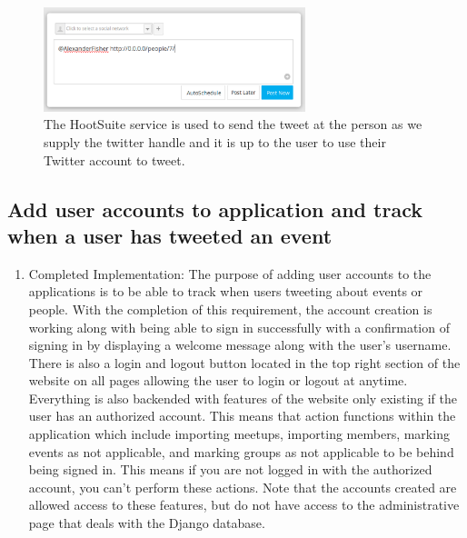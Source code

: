 \documentclass[draftclsnofoot,10pt,onecolumn]{IEEEtran} %
\begin{document}
\begin{enumerate}
\begin{figure}[H]
\begin{center}
  \end{center}
\end{figure}

\begin{figure}[H]
  \begin{center}
  
  \includegraphics[width=3in, frame]{tweet_person2}
  	\captionsetup{width=.4\linewidth}
  \centering
  \caption{The HootSuite service is used to send the tweet at the person as we supply the twitter handle and it is up to the user to use their Twitter account to tweet.}

  \end{center}
\end{figure}

\end{enumerate}

\subsection{Add user accounts to application and track when a user has tweeted an event}
\begin{enumerate}
  \item Completed Implementation: The purpose of adding user accounts to the applications
    is to be able to track when users tweeting about events or people. With the completion
    of this requirement, the account creation is working along with being able to sign in 
    successfully with a confirmation of signing in by displaying a welcome message along with
    the user's username. There is also a login and logout button located in the
    top right section of the website on all pages allowing the user to login or
    logout at anytime. Everything is also backended with features of the website only existing
    if the user has an authorized account. This means that action functions within the application
    which include importing meetups, importing members, marking events as not
    applicable, and marking groups as not applicable to be behind being signed in.
    This means if you are not logged in with the authorized account, you can't perform these 
    actions. Note that the accounts created are allowed access to these features, but do not
    have access to the administrative page that deals with the Django database.

\end{enumerate}
\end{document}
